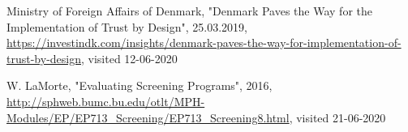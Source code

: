 \documentclass[11pt, fleqn, titlepage]{article}
\begin{document}
\begin{thebibliography}{9}
		 Ministry of Foreign Affairs of Denmark, "Denmark Paves the Way for the Implementation of Trust by Design", 25.03.2019, \url{https://investindk.com/insights/denmark-paves-the-way-for-implementation-of-trust-by-design}, visited 12-06-2020
		
		 W. LaMorte, "Evaluating Screening Programs", 2016, \url{http://sphweb.bumc.bu.edu/otlt/MPH-Modules/EP/EP713_Screening/EP713_Screening8.html}, visited 21-06-2020
		
		
	\end{thebibliography}
	
	
	\newpage
	
	
\end{document}

